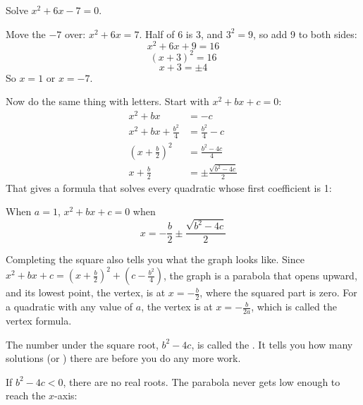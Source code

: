 \begin{Worked}
\begin{Problem}
Solve $x^2 + 6x - 7 = 0$.
\end{Problem}
\begin{Solution}
Move the $-7$ over: $x^2 + 6x = 7$. Half of 6 is 3, and
$3^2 = 9$, so add 9 to both sides:
$$x^2 + 6x + 9 = 16$$
$$(x + 3)^2 = 16$$
$$x + 3 = \pm 4$$
So $x = 1$ or $x = -7$.
\end{Solution}
\end{Worked}

Now do the same thing with letters. Start with $x^2 + bx + c = 0$:
\begin{align*}
x^2 + bx &= -c \\
x^2 + bx + \frac{b^2}{4} &= \frac{b^2}{4} - c \\
\left(x + \frac{b}{2}\right)^2 &= \frac{b^2 - 4c}{4} \\
x + \frac{b}{2} &= \pm \frac{\sqrt{b^2 - 4c}}{2}
\end{align*}
That gives a formula that solves every quadratic whose first coefficient
is 1:

\begin{mdframed}[style=important]
When $a = 1$, $x^2 + bx + c = 0$ when
\begin{equation*}
x = -\frac{b}{2} \pm \frac{\sqrt{b^2 - 4c}}{2}
\end{equation*}
\end{mdframed}

Completing the square also tells you what the graph looks like. Since
$x^2 + bx + c = \left(x + \frac{b}{2}\right)^2 + \left(c - \frac{b^2}{4}\right)$,
the graph is a parabola that opens upward, and its lowest point, the
vertex, is at $x = -\frac{b}{2}$, where the squared part is zero.
For a quadratic with any value of $a$, the vertex is at $x = -\frac{b}{2a}$,
which is called the vertex formula.

The number under the square root, $b^2 - 4c$, is called the
. It tells you how many solutions
(or ) there are before you do any more work.

If $b^2 - 4c < 0$, there are no real roots. The parabola never gets low
enough to reach the $x$-axis:
\begin{center}
\end{center}

